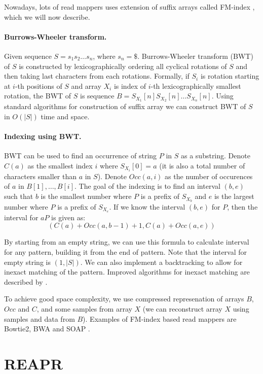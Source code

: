 Nowadays, lots of read mappers uses extension of suffix arrays called FM-index
\citep{fmindex, fmindex2}, which we will now describe.

\paragraph{Burrows-Wheeler transform.} Given sequence $S = s_1 s_2 \dots s_n$, where
$s_n = \$$. Burrows-Wheeler transform (BWT) of $S$ is constructed
by lexicographically ordering all cyclical rotations of $S$ and then
taking last characters from each rotations.
Formally, if $S_i$ is rotation starting at $i$-th positions of $S$ and array
$X_i$ is index of $i$-th lexicographically smallest rotation, the
BWT of $S$ is sequence $B = S_{X_1}[n] S_{X_2}[n] \dots S_{X_n}[n]$.
Using standard algorithms for construction of suffix array we
can construct BWT of $S$ in $O(|S|)$ time and space.

\paragraph{Indexing using BWT.}
BWT can be used to find an occurrence of string $P$ in $S$ as a substring.
Denote $C(a)$ as the smallest index $i$ where $S_{X_i}[0] = a$ (it is also
a total number of characters smaller than $a$ in $S$).
Denote $Occ(a,i)$ as the number of occurences of $a$ in $B[1], \dots, B[i]$.
The goal of the indexing is to find an interval $(b, e)$ such that
$b$ is the smallest number where $P$ is a prefix of $S_{X_b}$
and $e$ is the largest number where $P$ is a prefix of $S_{X_e}$.
If we know the interval $(b, e)$ for $P$, then the interval for
$aP$ is given as:
$$(C(a) + Occ(a, b - 1) + 1, C(a) + Occ(a, e))$$

By starting from an empty string, we can use
this formula to calculate interval for any pattern, building
it from the end of pattern. Note that
the interval for empty string is $(1, |S|)$.
We can also implement
a backtracking to allow for inexact matching of the pattern. 
Improved algorithms for inexact matching are described by \citet{fmindex3}.

To achieve good space complexity, we use compressed represenation
of arrays $B$, $Occ$ and $C$, and some samples from array $X$ (we can reconstruct
array $X$ using samples and data from $B$). 
Examples of FM-index based read mappers are Bowtie2, BWA and SOAP
\citep{bowtie2,fmindex,soap}.

\section{REAPR}

